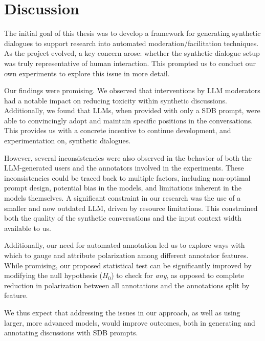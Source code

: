 %
\chapter{Discussion}
\label{sec:discussion}

The initial goal of this thesis was to develop a framework for generating synthetic dialogues to support research into automated moderation/facilitation techniques. As the project evolved, a key concern arose: whether the synthetic dialogue setup was truly representative of human interaction. This prompted us to conduct our own experiments to explore this issue in more detail.

Our findings were promising. We observed that interventions by LLM moderators had a notable impact on reducing toxicity within synthetic discussions. Additionally, we found that LLMs, when provided with only a \ac{SDB} prompt, were able to convincingly adopt and maintain specific positions in the conversations. This provides us with a concrete incentive to continue development, and experimentation on, synthetic dialogues.

However, several inconsistencies were also observed in the behavior of both the LLM-generated users and the annotators involved in the experiments. These inconsistencies could be traced back to multiple factors, including non-optimal prompt design, potential bias in the models, and limitations inherent in the models themselves. A significant constraint in our research was the use of a smaller and now outdated LLM, driven by resource limitations. This constrained both the quality of the synthetic conversations and the input context width available to us. 

Additionally, our need for automated annotation led us to explore ways with which to gauge and attribute polarization among different annotator features. While promising, our proposed statistical test can be significantly improved by modifying the null hypothesis ($H_0$) to check for \textit{any}, as opposed to complete reduction in polarization between all annotations and the annotations split by feature.

We thus expect that addressing the issues in our approach, as well as using larger, more advanced models, would improve outcomes, both in generating and annotating discussions with \ac{SDB} prompts.